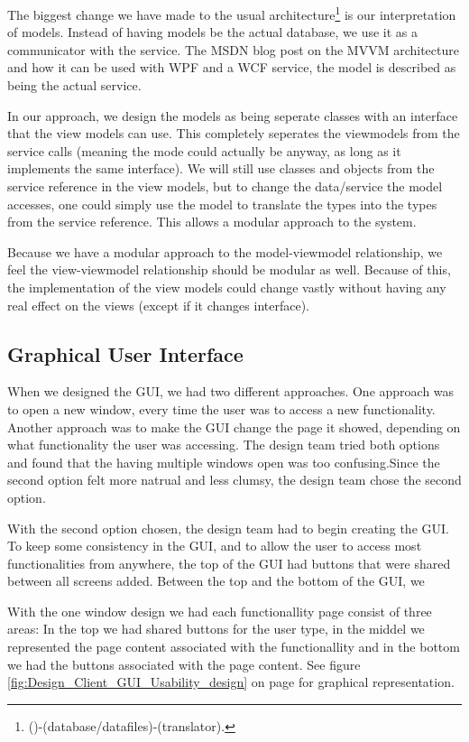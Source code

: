 The biggest change we have made to the usual architecture\footnote{()-(database/datafiles)-(translator).} is our interpretation of models. Instead of having models be the actual database, we use it as a communicator with the service. The MSDN blog post on the MVVM architecture \cite{MSDN-WPF-MVVM} and how it can be used with WPF and a WCF service, the model is described as being the actual service. 

In our approach, we design the models as being seperate classes with an interface that the view models can use. This completely seperates the viewmodels from the service calls (meaning the mode could actually be anyway, as long as it implements the same interface). We will still use classes and objects from the service reference in the view models, but to change the data/service the model accesses, one could simply use the model to translate the types into the types from the service reference. This allows a modular approach to the system.

Because we have a modular approach to the model-viewmodel relationship, we feel the view-viewmodel relationship should be modular as well. Because of this, the implementation of the view models could change vastly without having any real effect on the views (except if it changes interface).
\subsection{Graphical User Interface}
\label{Design_Client_GUI}
When we designed the GUI, we had two different approaches. One approach was to open a new window, every time the user was to access a new functionality. Another approach was to make the GUI change the page it showed, depending on what functionality the user was accessing. The design team tried both options and found that the having multiple windows open was too confusing.Since the second option felt more natrual and less clumsy, the design team chose the second option.

With the second option chosen, the design team had to begin creating the GUI. To keep some consistency in the GUI, and to allow the user to access most functionalities from anywhere, the top of the GUI had buttons that were shared between all screens added. Between the top and the bottom of the GUI, we 

With the one window design we had each functionallity page consist of three areas: In the top we had shared buttons for the user type, in the middel we represented the page content associated with the functionallity and in the bottom we had the buttons associated with the page content. See figure \ref{fig:Design_Client_GUI_Usability_design} on page \pageref{fig:Design_Client_GUI_Usability_design} for graphical representation.

